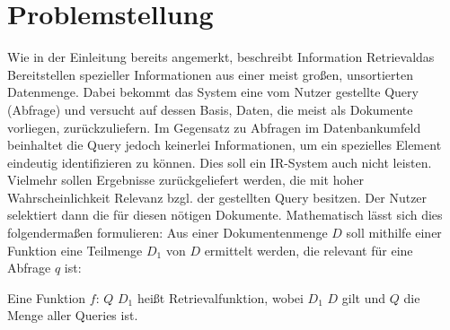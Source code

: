 \section{Problemstellung}
Wie in der Einleitung bereits angemerkt, beschreibt \glqq Information Retrieval\grqq das Bereitstellen spezieller Informationen aus einer meist großen, unsortierten Datenmenge. Dabei bekommt das System eine vom Nutzer gestellte Query (Abfrage) und versucht auf dessen Basis, Daten, die meist als Dokumente vorliegen, zurückzuliefern.
Im Gegensatz zu Abfragen im Datenbankumfeld beinhaltet die Query jedoch keinerlei Informationen, um ein spezielles Element eindeutig identifizieren zu können. Dies soll ein IR-System auch nicht leisten. Vielmehr sollen Ergebnisse zurückgeliefert werden, die mit hoher Wahrscheinlichkeit Relevanz bzgl. der gestellten Query besitzen. Der Nutzer selektiert dann die für diesen nötigen Dokumente.
\newline
Mathematisch lässt sich dies folgendermaßen formulieren:
Aus einer Dokumentenmenge $D$ soll mithilfe einer Funktion eine Teilmenge $D_1$ von $D$ ermittelt werden, die relevant für eine Abfrage $q$ ist:
\begin{defi}
	Eine Funktion $f$: $Q$ \rightarrow $D_1$ heißt Retrievalfunktion, wobei $D_1$ \subseteq $D$ gilt und $Q$ die Menge aller Queries ist.
\end{defi}